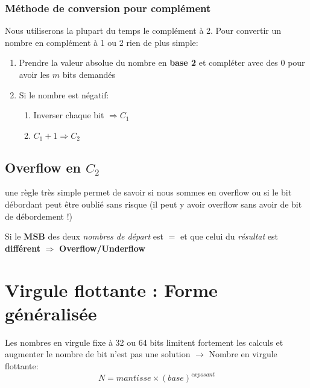 \subsubsection{Méthode de conversion pour complément}
Nous utiliserons la plupart du temps le complément à 2. Pour convertir un nombre en complément à 1 ou 2 rien de plus simple: 
\begin{enumerate}
	\item Prendre la valeur absolue du nombre en \textbf{base 2} et compléter avec des 0 pour avoir les $m$ bits demandés
	\item Si le nombre est négatif: 
	\begin{enumerate}
		\item Inverser chaque bit $\Rightarrow C_1$
		\item $C_1+1\Rightarrow C_2$
	\end{enumerate}
\end{enumerate}
\subsection{Overflow en $C_2$}
une règle très simple permet de savoir si nous sommes en overflow ou si le bit débordant peut être oublié sans risque (il peut y avoir overflow sans avoir de bit de débordement !)
\begin{center}
	Si le \textbf{MSB} des deux \textit{nombres de départ} est $\pmb{=}$ et que celui du \textit{résultat} est \textbf{différent} $\Rightarrow$ \textbf{Overflow/Underflow}
\end{center}
\section{Virgule flottante : Forme généralisée}
Les nombres en virgule fixe à 32 ou 64 bits limitent fortement les calculs et augmenter le nombre de bit n'est pas une solution $\rightarrow$ Nombre en virgule flottante:
\begin{equation}
N=mantisse\times(base)^{exposant}
\end{equation}
